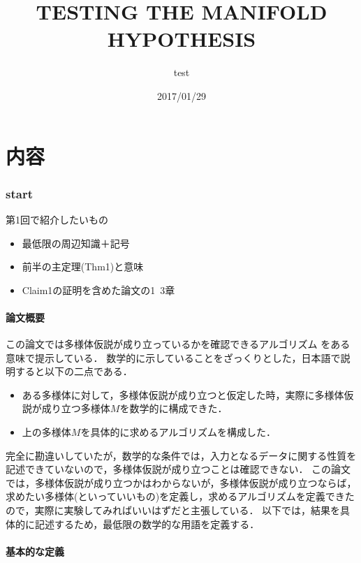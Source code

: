 \documentclass{ujarticle}
\title{TESTING THE MANIFOLD HYPOTHESIS}
\author{test}
\date{2017/01/29}
\begin{document}
\part{内容}

\section{start}
\label{start}
第1回で紹介したいもの
\begin{itemize}
  \item 最低限の周辺知識＋記号
  \item 前半の主定理(Thm1)と意味
  \item Claim1の証明を含めた論文の1~3章
\end{itemize}

\subsection{論文概要}
\label{sub:論文概要}

この論文では多様体仮説が成り立っているかを確認できるアルゴリズム
をある意味で提示している．
数学的に示していることをざっくりとした，日本語で説明すると以下の二点である．
\begin{itemize}
  \item ある多様体に対して，多様体仮説が成り立つと仮定した時，実際に多様体仮説が成り立つ多様体$M$を数学的に構成できた．
  \item 上の多様体$M$を具体的に求めるアルゴリズムを構成した．
\end{itemize}

完全に勘違いしていたが，数学的な条件では，入力となるデータに関する性質を記述できていないので，多様体仮説が成り立つことは確認できない．
この論文では，多様体仮説が成り立つかはわからないが，多様体仮説が成り立つならば，
求めたい多様体(といっていいもの)を定義し，求めるアルゴリズムを定義できたので，実際に実験してみればいいはずだと主張している．
以下では，結果を具体的に記述するため，最低限の数学的な用語を定義する．

\subsection{基本的な定義}
\label{sub:基本的な定義}
\end{document}
